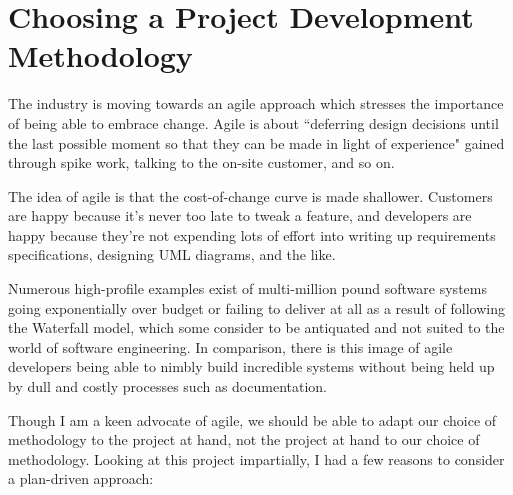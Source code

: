 \chapter{Choosing a Project Development Methodology}\label{appendix:methodology}

The industry is moving towards an agile approach which stresses the importance of being able to embrace change. Agile is about ``deferring design decisions until the last possible moment so that they can be made in light of experience" gained through spike work, talking to the on-site customer, and so on.

The idea of agile is that the cost-of-change curve is made shallower. Customers are happy because it's never too late to tweak a feature, and developers are happy because they're not expending lots of effort into writing up requirements specifications, designing UML diagrams, and the like.

Numerous high-profile examples exist of multi-million pound software systems going exponentially over budget or failing to deliver at all as a result of following the Waterfall model, which some consider to be antiquated and not suited to the world of software engineering. In comparison, there is this image of agile developers being able to nimbly build incredible systems without being held up by dull and costly processes such as documentation.

Though I am a keen advocate of agile, we should be able to adapt our choice of methodology to the project at hand, not the project at hand to our choice of methodology. Looking at this project impartially, I had a few reasons to consider a plan-driven approach:

